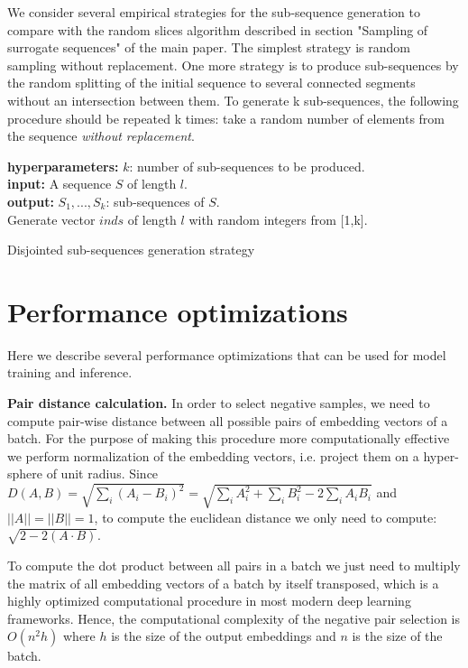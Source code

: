 \documentclass{article}
\begin{document}
We consider several empirical strategies for the sub-sequence generation to compare with the random slices algorithm described in section "Sampling of surrogate sequences" of the main paper.
The simplest strategy is random sampling without replacement.
One more strategy is to produce sub-sequences by the random splitting of the initial sequence to several connected segments without an intersection between them. To generate k sub-sequences, the following procedure should be repeated k times: take a random number of elements from the sequence \textit{without replacement}.

\begin{algorithm}
\SetAlgoLined
\textbf{hyperparameters:} $k$: number of sub-sequences to be produced. \\
\textbf{input:} A sequence $S$ of length $l$. \\
\textbf{output:} $S_1,...,S_k$: sub-sequences of $S$. \\

\BlankLine
Generate vector $inds$ of length $l$ with random integers from [1,k].\\
\caption{Disjointed sub-sequences generation strategy}
\label{alg-disj-ss}

\end{algorithm}

\section{Performance optimizations} \label{app-sec-perf-opt}

Here we describe several performance optimizations that can be used for model training and inference.

\textbf{Pair distance calculation.} In order to select negative samples, we need to compute pair-wise distance between all possible pairs of embedding vectors of a batch. For the purpose of making this procedure more computationally effective we perform normalization of the embedding vectors, i.e. project them on a hyper-sphere of unit radius. Since $D(A,B) = \sqrt{\sum_i(A_i - B_i)^2} = \sqrt{\sum_i A_i^2 + \sum_i B_i^2 - 2\sum_i A_i B_i} $ and $||A||= ||B||=1$, to compute the euclidean distance we only need to compute: $\sqrt{2 - 2(A \cdot B)}$.

To compute the dot product between all pairs in a batch we just need to multiply the matrix of all embedding vectors of a batch by itself transposed, which is a highly optimized computational procedure in most modern deep learning frameworks. Hence, the computational complexity of the negative pair selection is $O(n^2h)$ where $h$ is the size of the output embeddings and $n$ is the size of the batch.
\end{document}
